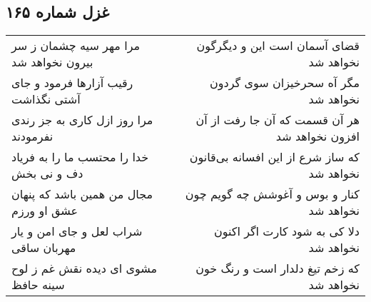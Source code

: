 \begin{center}
\section*{غزل شماره ۱۶۵}
\label{sec:sh165}
\begin{longtable}{l p{0.5cm} r}
مرا مهر سیه چشمان ز سر بیرون نخواهد شد
&&
قضای آسمان است این و دیگرگون نخواهد شد
\\
رقیب آزارها فرمود و جای آشتی نگذاشت
&&
مگر آه سحرخیزان سوی گردون نخواهد شد
\\
مرا روز ازل کاری به جز رندی نفرمودند
&&
هر آن قسمت که آن جا رفت از آن افزون نخواهد شد
\\
خدا را محتسب ما را به فریاد دف و نی بخش
&&
که ساز شرع از این افسانه بی‌قانون نخواهد شد
\\
مجال من همین باشد که پنهان عشق او ورزم
&&
کنار و بوس و آغوشش چه گویم چون نخواهد شد
\\
شراب لعل و جای امن و یار مهربان ساقی
&&
دلا کی به شود کارت اگر اکنون نخواهد شد
\\
مشوی ای دیده نقش غم ز لوح سینه حافظ
&&
که زخم تیغ دلدار است و رنگ خون نخواهد شد
\\
\end{longtable}
\end{center}
